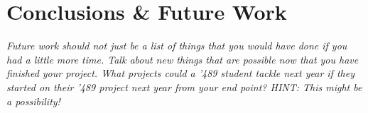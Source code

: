 \documentclass[conference]{IEEEtran}
\begin{document}
\section{Conclusions \& Future Work}

\textit{Future work should not just be a list of things that you would have done if you had a little more time. Talk about new things that are possible now that you have finished your project. What projects could a ’489 student tackle next year if they started on their '489 project next year from your end point? HINT: This might be a possibility!} \\








\end{document}
